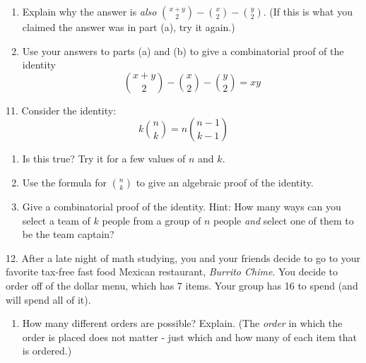 \documentclass[10pt,]{book}
\theoremstyle{plain}
\theoremstyle{definition}
\theoremstyle{definition}
\theoremstyle{definition}
\numberwithin{equation}{section}
\begin{document}
\begin{exerciselist}
\begin{enumerate}[label=(\alph*)]
                
\item\hypertarget{li-797}{}
                Explain why the answer is \emph{also} \({x+y \choose 2} - {x \choose 2} - {y \choose 2}\). (If this is what you claimed the answer was in part (a), try it again.)

                
\item\hypertarget{li-798}{}
                Use your answers to parts (a) and (b) to give a combinatorial proof of the identity
                \begin{equation*}
                  {x+y \choose 2} - {x \choose 2} - {y \choose 2} = xy
                \end{equation*}
                
\end{enumerate}
\par\smallskip
\item[11.]\hypertarget{exercise-134}{}
            Consider the identity:
            \begin{equation*}
              k{n\choose k} = n{n-1 \choose k-1}
            \end{equation*}
\leavevmode%
\begin{enumerate}[label=(\alph*)]
\item\hypertarget{li-799}{}
                Is this true? Try it for a few values of \(n\) and \(k\).

                
\item\hypertarget{li-800}{}
                Use the formula for \({n \choose k}\) to give an algebraic proof of the identity.

                
\item\hypertarget{li-801}{}
                Give a combinatorial proof of the identity. Hint: How many ways can you select a team of \(k\) people from a group of \(n\) people \emph{and} select one of them to be the team captain?

                
\end{enumerate}
\par\smallskip
\item[12.]\hypertarget{exercise-135}{}
            After a late night of math studying, you and your friends decide to go to your favorite tax-free fast food Mexican restaurant, \emph{Burrito Chime}. You decide to order off of the dollar menu, which has 7 items. Your group has
            \textdollar{}16 to spend (and will spend all of it).
\leavevmode%
\begin{enumerate}[label=(\alph*)]
\item\hypertarget{li-802}{}
                How many different orders are possible? Explain. (The \emph{order} in which the order is placed does not matter - just which and how many of each item that is ordered.)


\end{enumerate}
\end{exerciselist}
\end{document}

